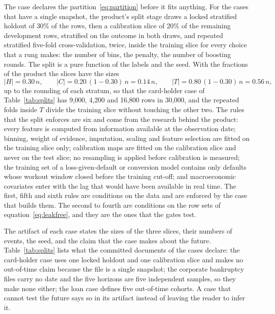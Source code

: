 The case declares the partition~\eqref{eq:partition} before it fits anything. For the cases that have a single snapshot, the product's split stage draws a locked stratified holdout of 30\% of the rows, then a calibration slice of 20\% of the remaining development rows, stratified on the outcome in both draws, and repeated stratified five-fold cross-validation, twice, inside the training slice for every choice that a rung makes: the number of bins, the penalty, the number of boosting rounds. The split is a pure function of the labels and the seed. With the fractions of the product the slices have the sizes
\begin{equation}
|H|=0.30\,n,\qquad |C|=0.20\,(1-0.30)\,n=0.14\,n,\qquad |T|=0.80\,(1-0.30)\,n=0.56\,n,
\label{eq:sizes}
\end{equation}
up to the rounding of each stratum, so that the card-holder case of Table~\ref{tab:splits} has 9,000, 4,200 and 16,800 rows in 30,000, and the repeated folds inside $T$ divide the training slice without touching the other two. The rules that the split enforces are six and come from the research behind the product: every feature is computed from information available at the observation date; binning, weight of evidence, imputation, scaling and feature selection are fitted on the training slice only; calibration maps are fitted on the calibration slice and never on the test slice; no resampling is applied before calibration is measured; the training set of a loss-given-default or conversion model contains only defaults whose workout window closed before the training cut-off; and macroeconomic covariates enter with the lag that would have been available in real time. The first, fifth and sixth rules are conditions on the data and are enforced by the case that builds them. The second to fourth are conditions on the row sets of equation~\eqref{eq:leakfree}, and they are the ones that the gates test.

The artifact of each case states the sizes of the three slices, their numbers of events, the seed, and the claim that the case makes about the future. Table~\ref{tab:splits} lists what the committed documents of the cases declare: the card-holder case uses one locked holdout and one calibration slice and makes no out-of-time claim because the file is a single snapshot; the corporate bankruptcy files carry no date and the five horizons are five independent samples, so they make none either; the loan case defines five out-of-time cohorts. A case that cannot test the future says so in its artifact instead of leaving the reader to infer it.

